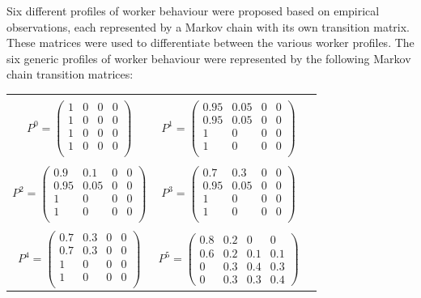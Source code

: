\documentclass[review,12pt, 3p, times]{elsarticle}
\begin{document}
Six different profiles of worker behaviour were proposed based on empirical observations, each represented by a Markov chain with its own transition matrix. These matrices were used to differentiate between the various worker profiles. The six generic profiles of worker behaviour were represented by the following Markov chain transition matrices:
\begin{table}[htbp] 
	\centering
	\begin{tabular}{ccc}
		& & \\
		$ P^0 = \left( {\begin{array}{cccc}
		1    & 0    & 0   & 0   \\
		1    & 0    & 0   & 0   \\
		1    & 0    & 0   & 0   \\
		1    & 0    & 0   & 0   \\
		\end{array} } \right)$ 
		&
		$P^1 = \left({\begin{array}{cccc}
		0.95 & 0.05 & 0   & 0   \\
		0.95 & 0.05 & 0   & 0   \\
		1    & 0    & 0   & 0   \\
		1    & 0    & 0   & 0   \\
		\end{array} } \right)$  \\
		& \\
		$P^2 = \left( {\begin{array}{cccc}
		0.9  & 0.1  & 0   & 0   \\
		0.95 & 0.05 & 0   & 0   \\
		1    & 0    & 0   & 0   \\
		1    & 0    & 0   & 0   \\
		\end{array} } \right)$ 
		&
		$P^3 = \left( {\begin{array}{cccc}
		0.7  & 0.3  & 0   & 0   \\
		0.95 & 0.05 & 0   & 0   \\
		1    & 0    & 0   & 0   \\
		1    & 0    & 0   & 0   \\
		\end{array} } \right)$ \\
		& \\
		$P^4 = \left( {\begin{array}{cccc}
		0.7  & 0.3  & 0   & 0   \\
		0.7  & 0.3  & 0   & 0   \\
		1    & 0    & 0   & 0   \\
		1    & 0    & 0   & 0   \\
		\end{array} } \right)$ 
		&
		$P^5 = \left( {\begin{array}{cccc}
		0.8  & 0.2  & 0   & 0   \\
		0.6  & 0.2  & 0.1 & 0.1 \\
		0    & 0.3  & 0.4 & 0.3 \\
		0    & 0.3  & 0.3 & 0.4 
		\end{array} } \right)$    
					

\end{tabular}
\end{table}
\end{document}
